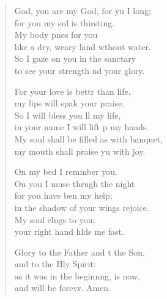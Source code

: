 \settowidth{\versewidth}{My soul shall be filled as with a banquet, *}
\begin{verse}%
  \begin{patverse}
     God, you are my God, for yu I long;\Med\\
for you my sul is thirsting.\\
My body p\pointup{\i}nes for you\Med\\
like a dry, weary land wthout water.\\
So I gaze on you in the sanctary\Med\\
to see your strength nd your glory.

For your love is bettr than life,\Med\\
my lips will spak your praise.\\
So I will bless you ll my life,\Med\\
in your name I will lift p my hands.\\
My soul shall be filled as with  banquet,\Med\\
my mouth shall praise yu with joy.

On my bed I remmber you.\Med\\
On you I muse thrugh the night\\
for you have ben my help;\Med\\
in the shadow of your wings  rejoice.\\
My soul cl\pointup{\i}ngs to you;\Med\\
your right hand hlds me fast.

Glory to the Father and t the Son,\Med\\
and to the Hly Spirit:\\
as it was in the beginn\pointup{\i}ng, is now,\Med\\
and will be forevr. Amen.
  \end{patverse}
\end{verse}
